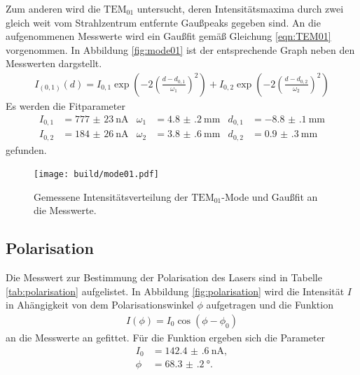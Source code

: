 Zum anderen wird die \textbf{$\text{TEM}_{01}$} untersucht, deren Intensitätsmaxima durch
zwei gleich weit vom Strahlzentrum entfernte Gaußpeaks gegeben sind.
An die aufgenommenen Messwerte wird ein Gaußfit gemäß Gleichung \ref{eqn:TEM01} vorgenommen.
In Abbildung \ref{fig:mode01} ist der entsprechende Graph neben den Messwerten dargstellt.
\begin{align}
  I_{(0,1)}(d)=I_{0,1}\exp\left(-2\left(\frac{d-d_{0,1}}{\omega_1}\right)^2\right)+I_{0,2}\exp\left(-2\left(\frac{d-d_{0,2}}{\omega_2}\right)^2\right) \label{eqn:TEM01}
\end{align}
Es werden die Fitparameter
 \begin{align}
   I_{0,1}&=\SI{777(23)}{\nano\ampere}& \omega_{1}&=\SI{4.8(2)}{\milli\meter} &   d_{0,1}&=\SI{-8.8(1)}{\milli\meter}\\
   I_{0,2}&=\SI{184(26)}{\nano\ampere}& \omega_{2}&=\SI{3.8(6)}{\milli\meter} &   d_{0,2}&=\SI{0.9(3)}{\milli\meter}
 \end{align}
gefunden.
\begin{figure}
  \centering
  \texttt{[image: build/mode01.pdf]}
  \caption{Gemessene Intensitätsverteilung der \textbf{$\text{TEM}_{01}$}-Mode und Gaußfit an die Messwerte.}
  \label{fig:plot}
\end{figure}



\subsection{Polarisation}
\label{subsec:Polarisation}
Die Messwert zur Bestimmung der Polarisation des Lasers sind in Tabelle \ref{tab:polarisation} aufgelistet.
In Abbildung \ref{fig:polarisation} wird die Intensität $I$ in Ahängigkeit von dem Polarisationswinkel $\phi$
aufgetragen und die Funktion
\begin{align}
I(\phi)=I_0 \cos\left(\phi-\phi_0\right)
\end{align}
an die Messwerte an gefittet.
Für die Funktion ergeben sich die Parameter
\begin{align}
I_0  & = \SI{142.4(6)}{\nano\ampere},\\
\phi & = \SI{68.3(2)}{\degree}.
\end{align}


